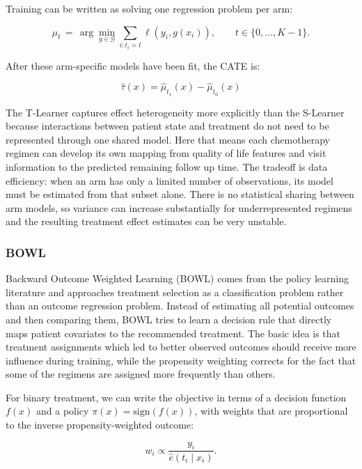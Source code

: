 \documentclass{article}
\begin{document}
Training can be written as solving one regression problem per arm:

\begin{equation}
    \hat{\mu}_t \,=\, \arg\min_{g \in \mathcal{G}} \sum_{i: t_i=t} \ell\!\left(y_i, g(x_i)\right), \qquad t \in \{0,\dots,K-1\}.
\end{equation}

After these arm-specific models have been fit, the CATE is:

\begin{equation}
    \hat{\tau}(x) = \hat{\mu}_{t_1}(x) - \hat{\mu}_{t_0}(x)
\end{equation}

The T-Learner captures effect heterogeneity more explicitly than the S-Learner because interactions between patient state and treatment do not need to be represented through one shared model. Here that means each chemotherapy regimen can develop its own mapping from quality of life features and visit information to the predicted remaining follow up time. The tradeoff is data efficiency: when an arm has only a limited number of observations, its model must be estimated from that subset alone. There is no statistical sharing between arm models, so variance can increase substantially for underrepresented regimens and the resulting treatment effect estimates can be very unstable.

\subsubsection*{BOWL}

Backward Outcome Weighted Learning (BOWL) comes from the policy learning literature and approaches treatment selection as a classification problem rather than an outcome regression problem. Instead of estimating all potential outcomes and then comparing them, BOWL tries to learn a decision rule that directly maps patient covariates to the recommended treatment. The basic idea is that treatment assignments which led to better observed outcomes should receive more influence during training, while the propensity weighting corrects for the fact that some of the regimens are assigned more frequently than others.

For binary treatment, we can write the objective in terms of a decision function $f(x)$ and a policy $\pi(x)=\mathrm{sign}(f(x))$, with weights that are proportional to the inverse propensity-weighted outcome:

\begin{equation}
    w_i \propto \frac{y_i}{\hat{e}(t_i \mid x_i)}.
\end{equation}
\end{document}
